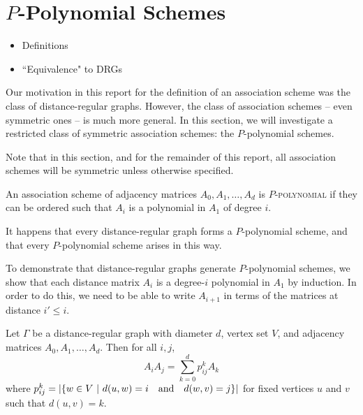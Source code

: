 \documentclass{report}
\begin{document}
      \newpage


  \section{$P$-Polynomial Schemes}\label{sec:AS:PPS}
    \begin{itemize}
      \item Definitions
      \item ``Equivalence" to DRGs
    \end{itemize}

    Our motivation in this report for the definition of an association scheme
    was the class of distance-regular graphs.  However, the class of association
    schemes -- even symmetric ones -- is much more general.  In this section, we
    will investigate a restricted class of symmetric association schemes: the
    $P$-polynomial schemes.

    Note that in this section, and for the remainder of this report, all
    association schemes will be symmetric unless otherwise specified.

    \begin{defn}\label{p-polynomial}
      An association scheme of adjacency matrices $A_0, A_1, \ldots, A_d$ is
      \textsc{$P$-polynomial} if they can be ordered such that $A_i$ is a
      polynomial in $A_1$ of degree $i$.
    \end{defn}

    It happens that every distance-regular graph forms a $P$-polynomial scheme,
    and that every $P$-polynomial scheme arises in this way.

    To demonstrate that distance-regular graphs generate $P$-polynomial schemes,
    we show that each distance matrix $A_i$ is a degree-$i$ polynomial in $A_1$
    by induction.  In order to do this, we need to be able to write $A_{i+1}$ in
    terms of the matrices at distance $i' \leq i$.

    \begin{lem}
      Let $\Gamma$ be a distance-regular graph with diameter $d$, vertex set
      $V$, and adjacency matrices $A_0, A_1, \ldots, A_d$.
      Then for all $i, j$,
      $$
        A_i A_j = \sum_{k=0}^d p_{ij}^k A_k
      $$
      where $p_{ij}^k = \left\lvert \left\lbrace  w \in V \ \middle| \ d(u, w) = i \quad\text{and}\quad d(w, v) = j  \right\rbrace \right\rvert$
      for fixed vertices $u$ and $v$ such that $d(u, v) = k$.
    \end{lem}
\end{document}
